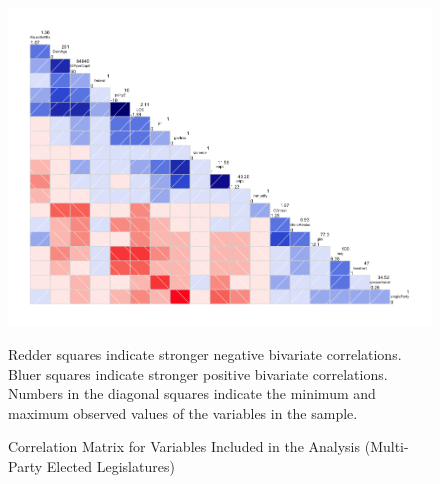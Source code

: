 \documentclass[a4paper]{article}\usepackage[]{graphicx}\usepackage[]{color}
\begin{document}
\begin{landscape}
\begin{figure}[t]
    \caption{Correlation Matrix for Variables Included in the Analysis (Multi-Party Elected Legislatures)}
    \label{corrmatrix}
    \begin{center}
    
    \includegraphics[width = \textwidth]{figure/corScatter.png}  






    \end{center}
    \begin{singlespace}
        {\scriptsize{Redder squares indicate stronger negative bivariate correlations. \\
        Bluer squares indicate stronger positive bivariate correlations. \\
        Numbers in the diagonal squares indicate the minimum and maximum observed values of the variables in the sample.
        }}
    \end{singlespace} 
\end{figure}
\end{landscape}

\end{document}
